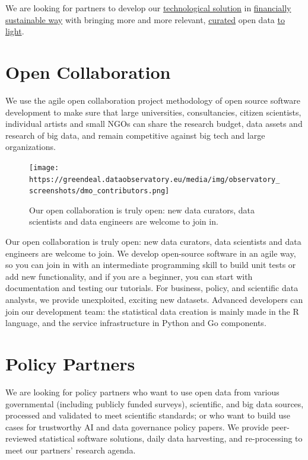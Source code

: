 \documentclass[
  a4paper,
  openany, a4paper, oneside]{book}
\begin{document}
We are looking for partners to develop our \protect\hyperlink{app}{technological solution} in \href{service}{financially sustainable way} with bringing more and more relevant, \protect\hyperlink{data-curators}{curated} open data \protect\hyperlink{open-data}{to light}.

\hypertarget{open-collaboration}{%
\section{Open Collaboration}\label{open-collaboration}}

We use the agile open collaboration project methodology of open source software development to make sure that large universities, consultancies, citizen scientists, individual artists and small NGOs can share the research budget, data assets and research of big data, and remain competitive against big tech and large organizations.

\begin{figure}
\centering
\texttt{[image: https://greendeal.dataobservatory.eu/media/img/observatory\_screenshots/dmo\_contributors.png]}
\caption{Our open collaboration is truly open: new data curators, data scientists and data engineers are welcome to join in.}
\end{figure}

Our open collaboration is truly open: new data curators, data scientists and data engineers are welcome to join. We develop open-source software in an agile way, so you can join in with an intermediate programming skill to build unit tests or add new functionality, and if you are a beginner, you can start with documentation and testing our tutorials. For business, policy, and scientific data analysts, we provide unexploited, exciting new datasets. Advanced developers can join our development team: the statistical data creation is mainly made in the R language, and the service infrastructure in Python and Go components.

\hypertarget{policy-partners}{%
\section{Policy Partners}\label{policy-partners}}

We are looking for policy partners who want to use open data from various governmental (including publicly funded surveys), scientific, and big data sources, processed and validated to meet scientific standards; or who want to build use cases for trustworthy AI and data governance policy papers. We provide peer-reviewed statistical software solutions, daily data harvesting, and re-processing to meet our partners' research agenda.
\end{document}
